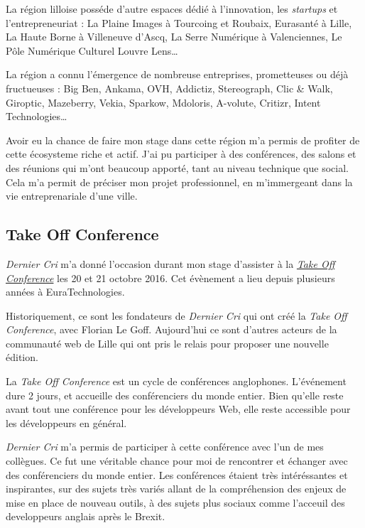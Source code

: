 \bigskip

La région lilloise posséde d'autre espaces dédié à l'innovation, les
\emph{startups} et l'entrepreneuriat : La Plaine Images à Tourcoing et
Roubaix, Eurasanté à Lille, La Haute Borne à Villeneuve d'Ascq, La Serre
Numérique à Valenciennes, Le Pôle Numérique Culturel Louvre Lens\ldots{}

\bigskip

La région a connu l'émergence de nombreuse entreprises, prometteuses ou
déjà fructueuses : Big Ben, Ankama, OVH, Addictiz, Stereograph, Clic \&
Walk, Giroptic, Mazeberry, Vekia, Sparkow, Mdoloris, A-volute, Critizr,
Intent Technologies\ldots{}

\bigskip

Avoir eu la chance de faire mon stage dans cette région m'a permis de
profiter de cette écosysteme riche et actif. J'ai pu participer à des
conférences, des salons et des réunions qui m'ont beaucoup apporté, tant
au niveau technique que social. Cela m'a permit de préciser mon projet
professionnel, en m'immergeant dans la vie entreprenariale d'une ville.

\bigskip

\subsection{Take Off Conference}\label{take-off-conference}

\bigskip

\emph{Dernier Cri} m'a donné l'occasion durant mon stage d'assister à la
\href{http://takeoffconf.com/2016}{\emph{Take Off Conference}} les 20 et
21 octobre 2016. Cet évènement a lieu depuis plusieurs années à
EuraTechnologies.

\bigskip

Historiquement, ce sont les fondateurs de \emph{Dernier Cri} qui ont
créé la \emph{Take Off Conference}, avec Florian Le Goff. Aujourd'hui ce
sont d'autres acteurs de la communauté web de Lille qui ont pris le
relais pour proposer une nouvelle édition.

\bigskip

La \emph{Take Off Conference} est un cycle de conférences anglophones.
L'événement dure 2 jours, et accueille des conférenciers du monde
entier. Bien qu'elle reste avant tout une conférence pour les
développeurs Web, elle reste accessible pour les développeurs en
général.

\bigskip

\emph{Dernier Cri} m'a permis de participer à cette conférence avec l'un
de mes collègues. Ce fut une véritable chance pour moi de rencontrer et
échanger avec des conférenciers du monde entier. Les conférences étaient
très intéréssantes et inspirantes, sur des sujets très variés allant de
la compréhension des enjeux de mise en place de nouveau outils, à des
sujets plus sociaux comme l'acceuil des developpeurs anglais après le
Brexit.

